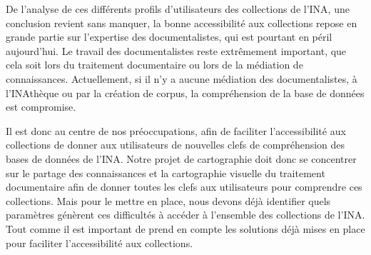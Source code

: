 De l'analyse de ces différents profils d'utilisateurs des collections de l'INA, une conclusion revient sans manquer, la bonne accessibilité aux collections repose en grande partie sur l'expertise des documentalistes, qui est pourtant en péril aujourd'hui. Le travail des documentalistes reste extrêmement important, que cela soit lors du traitement documentaire ou lors de la médiation de connaissances. Actuellement, si il n'y a aucune médiation des documentalistes, à l'INAthèque ou par la création de corpus, la compréhension de la base de données est compromise.

Il est donc au centre de nos préoccupations, afin de faciliter l'accessibilité aux collections de donner aux utilisateurs de nouvelles clefs de compréhension des bases de données de l'INA. Notre projet de cartographie doit donc se concentrer sur le partage des connaissances et la cartographie visuelle du traitement documentaire afin de donner toutes les clefs aux utilisateurs pour comprendre ces collections. Mais pour le mettre en place, nous devons déjà identifier quels paramètres génèrent ces difficultés à accéder à l'ensemble des collections de l'INA. Tout comme il est important de prend en compte les solutions déjà mises en place pour faciliter l'accessibilité aux collections. 